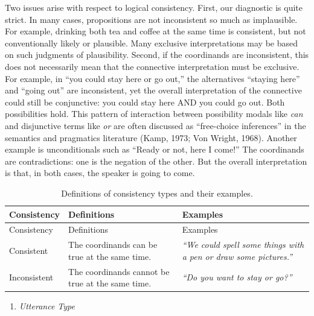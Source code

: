 \documentclass[
  english,
  ,man,floatsintext]{apa6}
\providecommand{\tightlist}{%
  \setlength{\itemsep}{0pt}\setlength{\parskip}{0pt}}
\begin{document}
Two issues arise with respect to logical consistency. First, our diagnostic is quite strict. In many cases, propositions are not inconsistent so much as implausible. For example, drinking both tea and coffee at the same time is consistent, but not conventionally likely or plausible. Many exclusive interpretations may be based on such judgments of plausibility. Second, if the coordinands are inconsistent, this does not necessarily mean that the connective interpretation must be exclusive. For example, in ``you could stay here or go out,'' the alternatives ``staying here'' and ``going out'' are inconsistent, yet the overall interpretation of the connective could still be conjunctive: you could stay here AND you could go out. Both possibilities hold. This pattern of interaction between possibility modals like \emph{can} and disjunctive terms like \emph{or} are often discussed as ``free-choice inferences'' in the semantics and pragmatics literature (Kamp, 1973; Von Wright, 1968). Another example is unconditionals such as ``Ready or not, here I come!'' The coordinands are contradictions: one is the negation of the other. But the overall interpretation is that, in both cases, the speaker is going to come.

\begin{longtable}[]{@{}
  >{\raggedright\arraybackslash}p{}
  >{\raggedright\arraybackslash}p{}
  >{\raggedright\arraybackslash}p{}@{}}
\caption{\label{tab:consistencyType} Definitions of consistency types and their examples.}\tabularnewline
\toprule
Consistency & Definitions & Examples \\
\midrule
\endfirsthead
\toprule
Consistency & Definitions & Examples \\
\midrule
\endhead
Consistent & The coordinands can be true at the same time. & \emph{``We could spell some things with a pen or draw some pictures.''} \\
Inconsistent & The coordinands cannot be true at the same time. & \emph{``Do you want to stay or go?''} \\
\bottomrule
\end{longtable}

\begin{enumerate}
\def\labelenumi{\arabic{enumi}.}
\setcounter{enumi}{2}
\tightlist
\item
  \emph{Utterance Type}
\end{enumerate}
\end{document}
